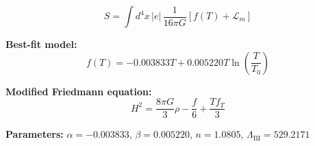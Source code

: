 
\begin{equation}
  S = \int d^4x \, |e| \, \frac{1}{16\pi G} \left[ f(T) + \mathcal{L}_m \right]
\end{equation}

\textbf{Best-fit model:}
\begin{equation}
  f(T) = -0.003833 T + 0.005220 T \ln\!\left(\frac{T}{T_0}\right)
\end{equation}

\textbf{Modified Friedmann equation:}
\begin{equation}
  H^2 = \frac{8\pi G}{3} \rho - \frac{f}{6} + \frac{T f_T}{3}
\end{equation}

\textbf{Parameters:}
$\alpha = -0.003833$, \quad
$\beta = 0.005220$, \quad
$n = 1.0805$, \quad
$\Lambda_{\text{BI}} = 529.2171$